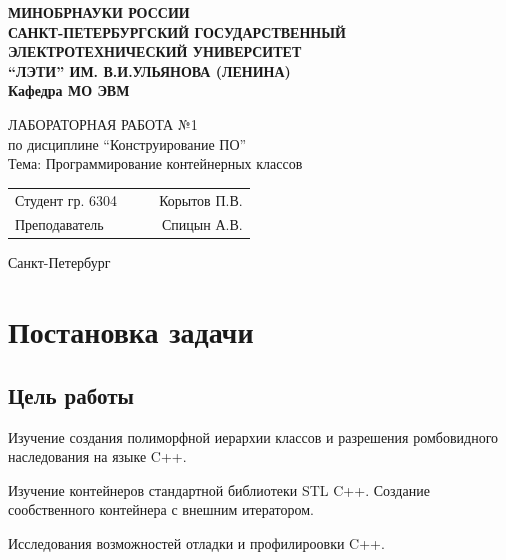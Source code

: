 \documentclass[a4paper, 14pt]{extarticle}
\begin{document}
    
\begin{titlepage}
    \centering
    {\bfseries
        \uppercase{%
            Минобрнауки России \\
            Санкт-Петербургский государственный \\
            Электротехнический университет \\
            \enquote{ЛЭТИ} им. В.И.Ульянова (Ленина)\\
        }
        Кафедра МО ЭВМ

        \vspace{\fill}
        \uppercase{Лабораторная работа №1} \\
        по дисциплине \enquote{Конструирование ПО} \\
        Тема: Программирование контейнерных классов
    }

    \vspace{\fill}
    \begin{tabularx}{0.8\textwidth}{l X c r}
        Студент гр. 6304 & & \underline{\hspace{3cm}} & Корытов П.В.\\
        Преподаватель & & \underline{\hspace{3cm}} & Спицын А.В.
    \end{tabularx}

    \vspace{1cm}
    Санкт-Петербург \\
    \the\year{}
\end{titlepage}
\newpage
\tableofcontents{}

\newpage

\section{Постановка задачи}
\subsection{Цель работы}
Изучение создания полиморфной иерархии классов и разрешения ромбовидного наследования на языке C++.

Изучение контейнеров стандартной библиотеки STL C++. Создание сообственного контейнера с внешним итератором.

Исследования возможностей отладки и профилироовки C++.
\end{document}
